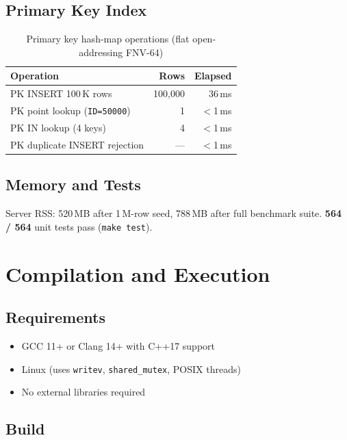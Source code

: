 \documentclass[12pt,a4paper]{article}
\begin{document}
\subsection{Primary Key Index}

\begin{table}[H]
\centering
\begin{tabular}{L{8cm} r r}
\toprule
\textbf{Operation} & \textbf{Rows} & \textbf{Elapsed} \\
\midrule
PK INSERT 100\,K rows                   & 100,000 & 36\,ms  \\
PK point lookup (\texttt{ID=50000})      & 1       & $<$1\,ms \\
PK IN lookup (4 keys)                    & 4       & $<$1\,ms \\
PK duplicate INSERT rejection            & ---     & $<$1\,ms \\
\bottomrule
\end{tabular}
\caption{Primary key hash-map operations (flat open-addressing FNV-64)}
\end{table}

\subsection{Memory and Tests}

Server RSS: 520\,MB after 1\,M-row seed, 788\,MB after full benchmark suite.
\textbf{564 / 564} unit tests pass (\texttt{make test}).

\section{Compilation and Execution}

\subsection{Requirements}

\begin{itemize}[noitemsep]
  \item GCC 11+ or Clang 14+ with C++17 support
  \item Linux (uses \texttt{writev}, \texttt{shared\_mutex}, POSIX threads)
  \item No external libraries required
\end{itemize}

\subsection{Build}
\end{document}
